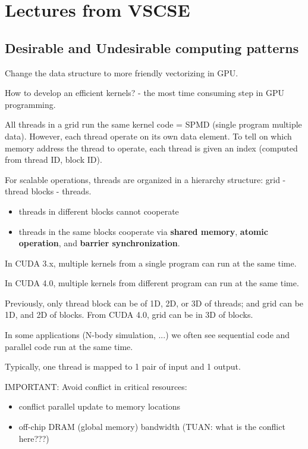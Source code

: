 \chapter{Lectures from VSCSE}
\label{chap:lectures-from-vscse}



\section{Desirable and Undesirable computing patterns}
\label{sec:desir-undes-comp}

Change the data structure to more friendly vectorizing in GPU. 

How to develop an efficient kernels? - the most time consuming step in
GPU programming. 

All threads in a grid run the same kernel code = SPMD (single program
multiple data). However, each thread operate on its own data
element. To tell on which memory address the thread to operate, each
thread is given an index (computed from thread ID, block ID). 

For scalable operations, threads are organized in a hierarchy
structure: grid - thread blocks - threads. 
\begin{itemize}
\item threads in different blocks cannot cooperate
\item threads in the same blocks cooperate via {\bf shared memory},
  {\bf atomic operation}, and {\bf barrier synchronization}.
\end{itemize}

In CUDA 3.x, multiple kernels from a single program can run at the
same time. 

In CUDA 4.0, multiple kernels from different program can run at the
same time. 

Previously, only thread block can be of 1D, 2D, or 3D of threads; and
grid can be 1D, and 2D of blocks.  From CUDA 4.0, grid can be in 3D of
blocks. 

In some applications (N-body simulation, ...) we often see sequential
code and parallel code run at the same time. 

Typically, one thread is mapped to 1 pair of input and 1 output.


IMPORTANT: Avoid conflict in critical resources:
\begin{itemize}
\item conflict parallel update to memory locations 
\item off-chip DRAM (global memory) bandwidth (TUAN: what is the
  conflict here???)
\end{itemize}

